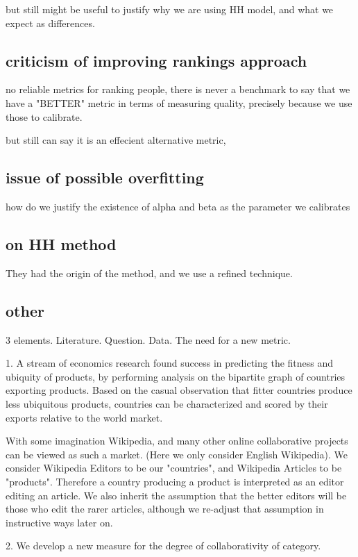 \documentclass{acm_proc_article-sp}
\begin{document}
but still might be useful to justify why we are using HH model, and what we expect as differences. 


\subsection{criticism of improving rankings approach}
no reliable metrics for ranking people, there is never a benchmark to say that we have a "BETTER" metric in terms of measuring quality, precisely because we use those to calibrate.

but still can say it is an effecient alternative metric, 

\subsection{issue of possible overfitting}
how do we justify the existence of alpha and beta as the parameter we calibrates

\subsection{ on HH method}
They had the origin of the method, and we use a refined technique.

\subsection{other}


3 elements. Literature. Question. Data. The need for a new metric.

1. A stream of economics research found success in predicting the fitness and ubiquity of products, by performing analysis on the bipartite graph of countries exporting products. Based on the casual observation that fitter countries produce less ubiquitous products, countries can be characterized and scored by their exports relative to the world market.

With some imagination Wikipedia, and many other online collaborative projects can be viewed as such a market. (Here we only consider English Wikipedia). We consider Wikipedia Editors to be our "countries", and Wikipedia Articles to be "products". Therefore a country producing a product is interpreted as an editor editing an article. We also inherit the assumption that the better editors will be those who edit the rarer articles, although we re-adjust that assumption in instructive ways later on. 


2. We develop a new measure for the degree of collaborativity of category.
\end{document}
